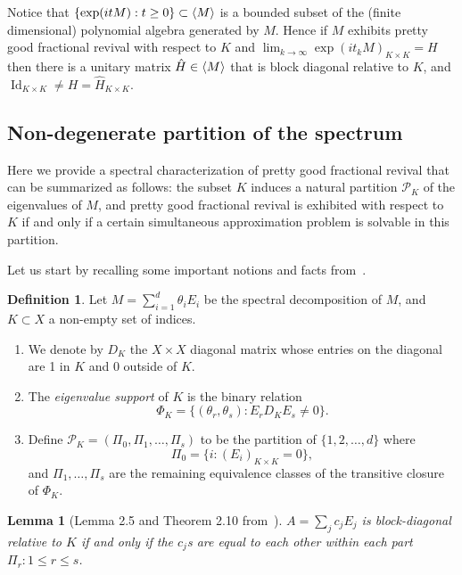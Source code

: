 \documentclass[11pt]{article}
\newtheorem{lemma}[theo]{Lemma}
\theoremstyle{definition}
\newtheorem{defi}[theo]{Definition}
\numberwithin{equation}{section}
\newcommand{\PK}[1][K]{\mathcal{P}_{#1}}
\newcommand\+{\mkern2mu}
\newcommand{\1}{\mathbf 1}
\DeclareMathOperator{\Id}{Id}
\DeclarePairedDelimiter{\sprod}{\langle}{\rangle}
\begin{document}
Notice that $\{ \exp(i t M) : t \geq 0\}  \subset \sprod{M}$ is a bounded subset of the (finite dimensional) polynomial algebra generated by $M$. Hence if $M$ exhibits pretty good fractional revival with respect to $K$ and $\lim_{k \to \infty} \exp(i t_k M)_{K \times K} = H$ then there is a unitary matrix $\hat{H} \in \sprod{M}$ that is block diagonal relative to $K$, and $\Id_{K \times K} \neq H = \hat{H}_{K\times K}$. 

\subsection{Non-degenerate partition of the spectrum}

Here we provide a spectral characterization of pretty good fractional revival that can be summarized as follows: the subset $K$ induces a natural partition $\PK$ of the eigenvalues of $M$, and pretty good fractional revival is exhibited with respect to $K$ if and only if a certain simultaneous approximation problem is solvable in this partition. 

Let us start by recalling some important notions and facts from~\cite{chan2020fundamentals}.

\begin{defi}\label{def:partition}
Let $M = \sum_{i=1}^d \theta_i E_i$ be the spectral decomposition of $M$, and $K \subset X$ a non-empty set of indices.
\begin{enumerate}
\item We denote by $D_K$ the $X \times X$ diagonal matrix whose entries on the diagonal are 1 in $K$ and 0 outside of $K$. 
\item The \emph{eigenvalue support} of $K$ is the binary relation \[ \Phi_K = \{ (\theta_r, \theta_s) : E_r D_K E_s \neq 0 \}.\]
\item Define $\PK = (\Pi_0, \Pi_1,\dots, \Pi_s)$ to be the partition of $\{1,2,\dots, d\}$ where 
\[ \Pi_0 = \{ i: (E_i)_{K\times K} = 0 \},\] and $\Pi_1,\dots, \Pi_s$ are the remaining equivalence classes of the transitive closure of $\Phi_K$.
\end{enumerate}
\end{defi}

\begin{lemma}[Lemma 2.5 and Theorem 2.10 from~\cite{chan2020fundamentals}]\label{lem:decomposable}
$A = \sum_j c_j E_j$ is block-diagonal relative to $K$ if and only if the $c_j$s are equal to each other within each part $\Pi_r : 1\leq r \leq s$.
\end{lemma}
\end{document}
